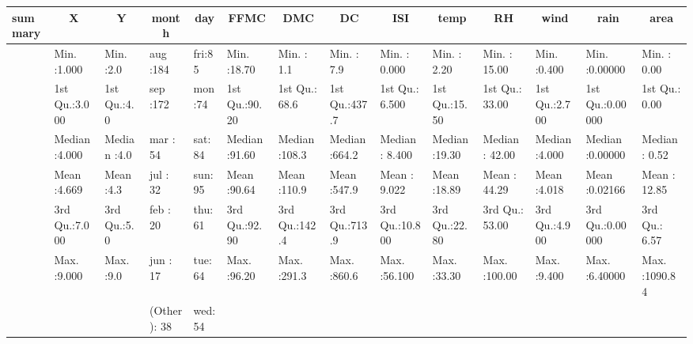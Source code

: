 \begin{table}[!tbp]
\begin{center}
\begin{tabular}{llllllllllllll}
\hline\hline
\multicolumn{1}{l}{summary}&\multicolumn{1}{c}{      X}&\multicolumn{1}{c}{      Y}&\multicolumn{1}{c}{    month}&\multicolumn{1}{c}{ day}&\multicolumn{1}{c}{     FFMC}&\multicolumn{1}{c}{     DMC}&\multicolumn{1}{c}{      DC}&\multicolumn{1}{c}{     ISI}&\multicolumn{1}{c}{     temp}&\multicolumn{1}{c}{      RH}&\multicolumn{1}{c}{     wind}&\multicolumn{1}{c}{     rain}&\multicolumn{1}{c}{     area}\tabularnewline
\hline
&Min.   :1.000  &Min.   :2.0  &aug    :184  &fri:85  &Min.   :18.70  &Min.   :  1.1  &Min.   :  7.9  &Min.   : 0.000  &Min.   : 2.20  &Min.   : 15.00  &Min.   :0.400  &Min.   :0.00000  &Min.   :   0.00  \tabularnewline
&1st Qu.:3.000  &1st Qu.:4.0  &sep    :172  &mon:74  &1st Qu.:90.20  &1st Qu.: 68.6  &1st Qu.:437.7  &1st Qu.: 6.500  &1st Qu.:15.50  &1st Qu.: 33.00  &1st Qu.:2.700  &1st Qu.:0.00000  &1st Qu.:   0.00  \tabularnewline
&Median :4.000  &Median :4.0  &mar    : 54  &sat:84  &Median :91.60  &Median :108.3  &Median :664.2  &Median : 8.400  &Median :19.30  &Median : 42.00  &Median :4.000  &Median :0.00000  &Median :   0.52  \tabularnewline
&Mean   :4.669  &Mean   :4.3  &jul    : 32  &sun:95  &Mean   :90.64  &Mean   :110.9  &Mean   :547.9  &Mean   : 9.022  &Mean   :18.89  &Mean   : 44.29  &Mean   :4.018  &Mean   :0.02166  &Mean   :  12.85  \tabularnewline
&3rd Qu.:7.000  &3rd Qu.:5.0  &feb    : 20  &thu:61  &3rd Qu.:92.90  &3rd Qu.:142.4  &3rd Qu.:713.9  &3rd Qu.:10.800  &3rd Qu.:22.80  &3rd Qu.: 53.00  &3rd Qu.:4.900  &3rd Qu.:0.00000  &3rd Qu.:   6.57  \tabularnewline
&Max.   :9.000  &Max.   :9.0  &jun    : 17  &tue:64  &Max.   :96.20  &Max.   :291.3  &Max.   :860.6  &Max.   :56.100  &Max.   :33.30  &Max.   :100.00  &Max.   :9.400  &Max.   :6.40000  &Max.   :1090.84  \tabularnewline
&&&(Other): 38  &wed:54  &&&&&&&&&\tabularnewline
\hline
\end{tabular}\end{center}
\end{table}
